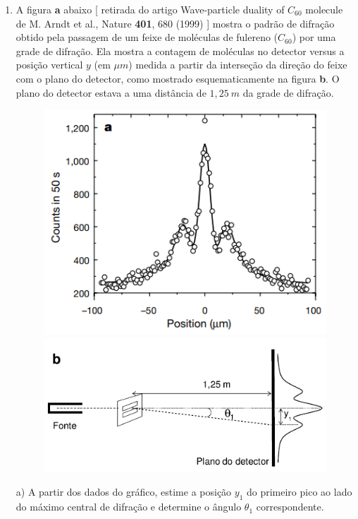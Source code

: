 \begin{enumerate}[start=1,label={\bfseries Q\arabic*.}]
\item A figura \textbf{a} abaixo [ retirada do artigo Wave-particle duality of $C_{60}$ molecule de M. Arndt et al., Nature \textbf{401}, 680 (1999) ] mostra o padrão de difração obtido pela passagem de um feixe de moléculas de fulereno ($C_{60}$) por uma grade de difração. Ela mostra a contagem de moléculas no detector versus a posição vertical $y$ (em $\mu m$) medida a partir da interseção da direção do feixe com o plano do detector, como mostrado esquematicamente na figura \textbf{b}. O plano do detector estava a uma distância de $1,25 \ m$ da grade de difração.

\begin{figure}[H]
  \centering
  \includegraphics[scale=0.5]{moderna-img/carbono.png}
  \includegraphics[scale=0.5]{moderna-img/carbonoespa.png}
\end{figure}


  a) A partir dos dados do gráfico, estime a posição $y_{1}$ do primeiro pico ao lado do máximo central de difração e determine o ângulo $\theta_{1}$ correspondente.

  \resposta


\end{enumerate}
